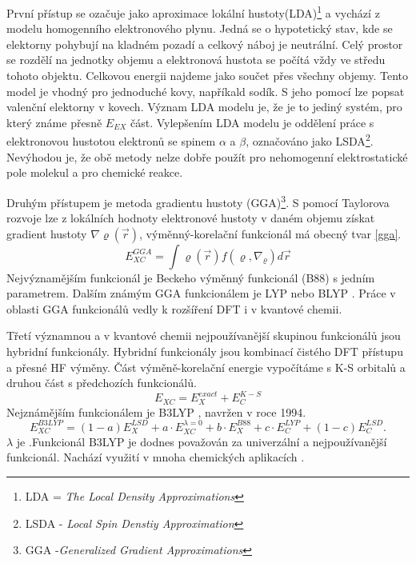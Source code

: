 \documentclass[
digital, %
table,   %
lof,     %
lot,     %
oneside,
]{fithesis3}
\begin{document}
První přístup se ozačuje jako aproximace lokální hustoty(LDA)\footnote{LDA = \textit{The Local Density Approximations}} a vychází z modelu homogenního elektronového plynu. Jedná se o hypotetický stav, kde se elektorny pohybují na kladném pozadí a celkový náboj je neutrální. Celý prostor se rozdělí na jednotky objemu a elektronová hustota se počítá vždy ve středu tohoto objektu. Celkovou energii najdeme jako součet přes všechny objemy. Tento model je vhodný pro jednoduché kovy, napříkald sodík. S jeho pomocí lze popsat valenční elektorny v kovech. Význam LDA modelu je, že je to jediný systém, pro který známe přesně $E_{EX}$ část. Vylepšením LDA modelu je oddělení práce s elektronovou hustotou elektronů se spinem $\alpha$ a $\beta$, označováno jako LSDA\footnote{LSDA - \textit{Local Spin Denstiy Approximation}}. Nevýhodou je, že obě metody nelze dobře použít pro nehomogenní elektrostatické pole molekul a pro chemické reakce.

Druhým přístupem je metoda gradientu hustoty (GGA)\footnote{GGA -\textit{Generalized Gradient Approximations}}. S pomocí Taylorova rozvoje lze z lokálních hodnoty elektronové hustoty v daném objemu získat gradient hustoty $\nabla \varrho(\vec{r})$, výměnný-korelační funkcionál má obecný tvar \ref{gga}.
\begin{equation}
E_{XC}^{GGA} = \int \varrho(\vec{r})f(\varrho, \nabla_{\varrho})d\vec{r}
\label{gga}
\end{equation}
Nejvýznamějším funkcionál je Beckeho výměnný funkcionál (B88) s jedním parametrem. Dalším známým GGA funkcionálem je LYP \cite{lyp} nebo BLYP \cite{blyp}. Práce v oblasti GGA funkcionálů vedly k rozšíření DFT i v kvantové chemii.

Třetí významnou a v kvantové chemii nejpoužívanější skupinou funkcionálů jsou hybridní funkcionály. Hybridní funkcionály jsou kombinací čistého DFT přístupu a přesné HF výměny. Část výměně-korelační energie vypočítáme s K-S orbitalů a druhou část s předchozích funkcionálů.
\begin{equation}
E_{XC} = E_{X}^{exact} + E_C^{K-S}
\end{equation}
Nejznámějším funkcionálem je B3LYP \cite{b3lyp}, navržen v roce 1994.
\begin{equation}
E_{XC}^{B3LYP} = (1-a)E_{X}^{LSD} + a \cdot E_{XC}^{\lambda = 0} + b \cdot E_{X}^{B88} + c \cdot E_{C}^{LYP} + (1-c)E_{C}^{LSD}.
\end{equation}
$\lambda$ je .Funkcionál B3LYP je dodnes považován za univerzální a nejpoužívanější funkcionál. Nachází využití v mnoha chemických aplikacích \cite{koch2000chemist}.
\end{document}
